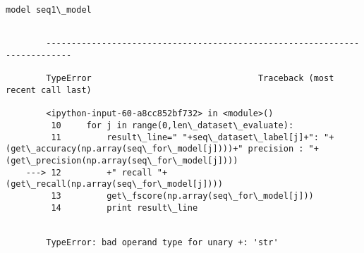 \documentclass{article}
\begin{document}
    \begin{Verbatim}[commandchars=\\\{\}]
model seq1\_model
    \end{Verbatim}

    \begin{Verbatim}[commandchars=\\\{\}]

        ---------------------------------------------------------------------------

        TypeError                                 Traceback (most recent call last)

        <ipython-input-60-a8cc852bf732> in <module>()
         10     for j in range(0,len\_dataset\_evaluate):
         11         result\_line=" "+seq\_dataset\_label[j]+": "+(get\_accuracy(np.array(seq\_for\_model[j])))+" precision : "+(get\_precision(np.array(seq\_for\_model[j])))
    ---> 12         +" recall "+(get\_recall(np.array(seq\_for\_model[j])))
         13         get\_fscore(np.array(seq\_for\_model[j]))
         14         print result\_line


        TypeError: bad operand type for unary +: 'str'

    \end{Verbatim}
\end{document}
